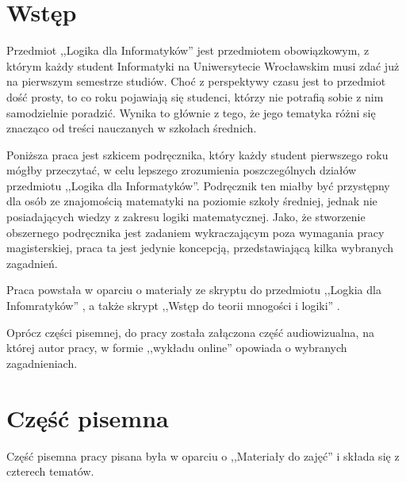 \section{Wstęp}
Przedmiot ,,Logika dla Informatyków'' jest przedmiotem obowiązkowym, z którym każdy student Informatyki na Uniwersytecie Wrocławskim musi zdać już na pierwszym semestrze studiów. Choć z perspektywy czasu jest to przedmiot dość prosty, to co roku pojawiają się studenci, którzy nie potrafią sobie z nim samodzielnie poradzić. Wynika to głównie z tego, że jego tematyka różni się znacząco od treści nauczanych w szkołach średnich.

Poniższa praca jest szkicem podręcznika, który każdy student pierwszego roku mógłby przeczytać, w celu lepszego zrozumienia poszczególnych działów przedmiotu ,,Logika dla Informatyków''. Podręcznik ten miałby być przystępny dla osób ze znajomością matematyki na poziomie szkoły średniej, jednak nie posiadających wiedzy z zakresu logiki matematycznej. Jako, że stworzenie obszernego podręcznika jest zadaniem wykraczającym poza wymagania pracy magisterskiej, praca ta jest jedynie koncepcją, przedstawiającą kilka wybranych zagadnień.

Praca powstała w oparciu o materiały ze skryptu do przedmiotu ,,Logkia dla Infomratyków'' \cite{skrypt}, a także skrypt ,,Wstęp do teorii mnogości i logiki'' \cite{tiuryn}.

Oprócz części pisemnej, do pracy została załączona część audiowizualna, na której autor pracy, w formie ,,wykładu online'' opowiada o wybranych zagadnieniach. 

\section{Część pisemna}
Część pisemna pracy pisana była w oparciu o ,,Materiały do zajęć'' i składa się z czterech tematów.

